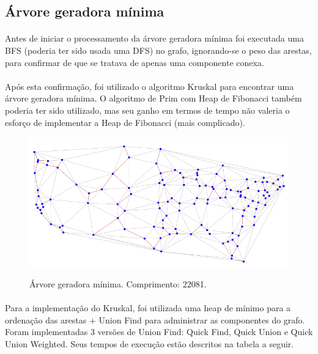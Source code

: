 \documentclass[11pt,a4paper]{article}
\begin{document}
    \newpage
        \subsection{Árvore geradora mínima}
        \paragraph{}
        Antes de iniciar o processamento da árvore geradora mínima foi executada uma BFS (poderia ter sido usada uma DFS) no grafo, ignorando-se o peso das arestas, para confirmar de que se tratava de apenas uma componente conexa.

        \paragraph{}
        Após esta confirmação, foi utilizado o algoritmo Kruskal para encontrar uma árvore geradora mínima. O algoritmo de Prim com Heap de Fibonacci também poderia ter sido utilizado, mas seu ganho em termos de tempo não valeria o esforço de implementar a Heap de Fibonacci (mais complicado).

        \begin{figure}[htb!]
          \centering
              \captionsetup{justification=centering}  
              \includegraphics[scale=0.5]{mst_map}
              \label{fig:mstmap}
              \caption{Árvore geradora mínima. Comprimento: 22081.}
        \end{figure}

        \paragraph{}
        Para a implementação do Kruskal, foi utilizada uma heap de mínimo para a ordenação das arestas + Union Find para administrar as componentes do grafo. Foram implementadas 3 versões de Union Find: Quick Find, Quick Union e Quick Union Weighted. Seus tempos de execução estão descritos na tabela a seguir.
\end{document}
